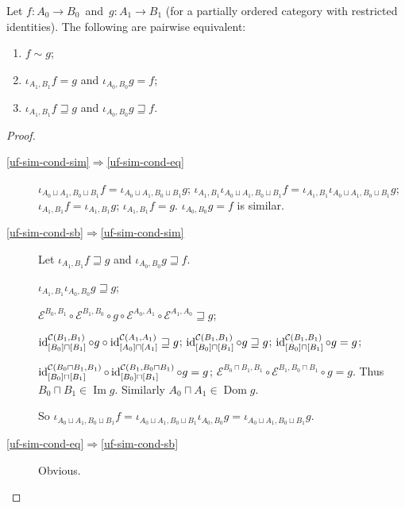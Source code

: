 \begin{thm}\label{uf-sim-cond}
Let
$f:A_0\to B_0$~and~$g:A_1\to B_1$
(for a partially ordered category with restricted identities).
The following are pairwise equivalent:
\begin{enumerate}
\item\label{uf-sim-cond-sim} $f\sim g$;
\item\label{uf-sim-cond-eq} $\iota_{A_1,B_1}f=g$ and $\iota_{A_0,B_0}g=f$;
\item\label{uf-sim-cond-sb} $\iota_{A_1,B_1}f\sqsupseteq g$ and $\iota_{A_0,B_0}g\sqsupseteq f$.
\end{enumerate}
\end{thm}

\begin{proof}
~
\begin{description}
\item[\ref{uf-sim-cond-sim}$\Rightarrow$\ref{uf-sim-cond-eq}]
$\iota_{A_0\sqcup A_1,B_0\sqcup B_1}f=\iota_{A_0\sqcup A_1,B_0\sqcup B_1}g$;
$\iota_{A_1,B_1}\iota_{A_0\sqcup A_1,B_0\sqcup B_1}f=\iota_{A_1,B_1}\iota_{A_0\sqcup A_1,B_0\sqcup B_1}g$;
$\iota_{A_1,B_1}f=\iota_{A_1,B_1}g$;
$\iota_{A_1,B_1}f=g$. $\iota_{A_0,B_0}g=f$ is similar.

\item[\ref{uf-sim-cond-sb}$\Rightarrow$\ref{uf-sim-cond-sim}]
Let $\iota_{A_1, B_1} f \sqsupseteq g$ and $\iota_{A_0, B_0} g \sqsupseteq f$.

$\iota_{A_1, B_1} \iota_{A_0, B_0} g \sqsupseteq g$;

$\mathcal{E}^{B_0, B_1} \circ \mathcal{E}^{B_1, B_0} \circ g \circ
\mathcal{E}^{A_0, A_1} \circ \mathcal{E}^{A_1, A_0}\sqsupseteq g$;

$\operatorname{id}^{\mathcal{C} (B_1, B_1)}_{[B_0]\sqcap[B_1]} \circ g \circ
\operatorname{id}^{\mathcal{C} (A_1, A_1)}_{[A_0]\sqcap[A_1]} \sqsupseteq g$;
$\operatorname{id}^{\mathcal{C} (B_1, B_1)}_{[B_0]\sqcap[B_1]} \circ g \sqsupseteq g$;
$\operatorname{id}^{\mathcal{C} (B_1, B_1)}_{[B_0]\sqcap[B_1]} \circ g = g$;

$\operatorname{id}^{\mathcal{C} (B_0 \sqcap B_1, B_1)}_{[B_0]\sqcap[B_1]} \circ
\operatorname{id}^{\mathcal{C} (B_1, B_0 \sqcap B_1)}_{[B_0]\sqcap[B_1]} \circ g = g$;
$\mathcal{E}^{B_0 \sqcap B_1, B_1} \circ \mathcal{E}^{B_1, B_0 \sqcap B_1}
\circ g = g$. Thus $B_0 \sqcap B_1 \in \operatorname{Im} g$. Similarly $A_0 \sqcap A_1
\in \operatorname{Dom} g$.

So $\iota_{A_0 \sqcup A_1, B_0 \sqcup B_1} f = \iota_{A_0 \sqcup A_1, B_0
\sqcup B_1} \iota_{A_0, B_0} g = \iota_{A_0 \sqcup A_1, B_0 \sqcup B_1} g$.

\item[\ref{uf-sim-cond-eq}$\Rightarrow$\ref{uf-sim-cond-sb}]
Obvious.
\end{description}
\end{proof}

